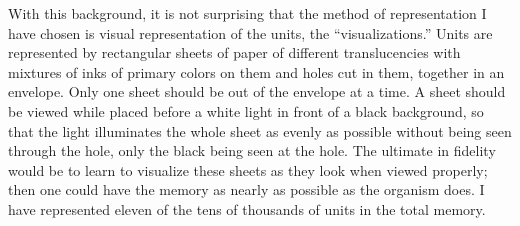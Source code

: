 With this background, it is not surprising that the method of 
representation I have chosen is visual representation of the units, the 
\enquote{visualizations.} Units are represented by rectangular sheets of paper of 
different translucencies with mixtures of inks of primary colors on them and 
holes cut in them, together in an envelope. Only one sheet should be out of 
the envelope at a time. A sheet should be viewed while placed before a white 
light in front of a black background, so that the light illuminates the whole 
sheet as evenly as possible without being seen through the hole, only the 
black being seen at the hole. The ultimate in fidelity would be to learn to 
visualize these sheets as they look when viewed properly; then one could 
have the memory as nearly as possible as the organism does. I have 
represented eleven of the tens of thousands of units in the total memory. 

